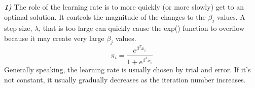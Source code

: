 \documentclass[10pt,letterpaper]{article}
\begin{document}


\textbf{\textit{1)}} The role of the learning rate is to more quickly (or more slowly) get to an optimal solution.  It controls the magnitude of the changes to the $\beta_{j}$ values.  A step size, $\lambda$, that is too large can quickly cause the exp() function to overflow because it may create very large $\beta_j$ values.\\
\begin{equation}
  \pi_{i} = \frac{e^{\beta^{T}x_i}}{1 + e^{\beta^{T}x_i}}
\end{equation}
Generally speaking, the learning rate is usually chosen by trial and error.  If it's not constant, it usually gradually decreases as the iteration number increases.\\
\end{document}
